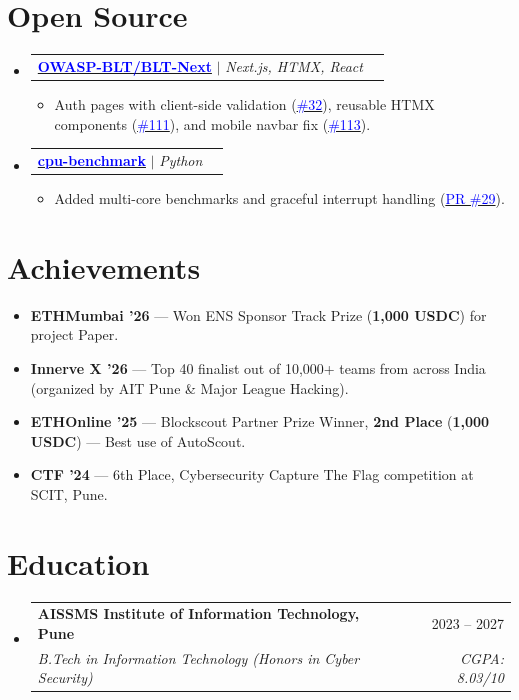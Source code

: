\documentclass[a4paper,11pt]{article}
\makeatletter
\newcommand{\resumeItem}[1]{
  \item\small{
    {#1 \vspace{-2pt}}
  }
}
\newcommand{\resumeSubheading}[4]{
  \vspace{-2pt}\item
    \begin{tabular*}{0.97\textwidth}[t]{l@{\extracolsep{\fill}}r}
      \textbf{#1} & #2 \\
      \textit{\small#3} & \textit{\small #4} \\
    \end{tabular*}\vspace{-7pt}
}
\newcommand{\resumeProjectHeading}[2]{
    \item
    \begin{tabular*}{0.97\textwidth}{l@{\extracolsep{\fill}}r}
      \small#1 & #2 \\
    \end{tabular*}\vspace{-7pt}
}
\newcommand{\resumeSubHeadingListStart}{\begin{itemize}[leftmargin=0.15in, label={}]}
\newcommand{\resumeSubHeadingListEnd}{\end{itemize}}
\newcommand{\resumeItemListStart}{\begin{itemize}}
\newcommand{\resumeItemListEnd}{\end{itemize}\vspace{-4pt}}
\makeatother
\begin{document}
\section{Open Source}
  \resumeSubHeadingListStart
    \resumeProjectHeading
    {\textbf{\href{https://github.com/OWASP-BLT/BLT-Next}{\textcolor{blue}{OWASP-BLT/BLT-Next}}} $|$ \footnotesize\emph{Next.js, HTMX, React}}{}
    \resumeItemListStart
        \resumeItem{Auth pages with client-side validation (\href{https://github.com/OWASP-BLT/BLT-Next/pull/32}{\textcolor{blue}{\#32}}), reusable HTMX components (\href{https://github.com/OWASP-BLT/BLT-Next/pull/111}{\textcolor{blue}{\#111}}), and mobile navbar fix (\href{https://github.com/OWASP-BLT/BLT-Next/pull/113}{\textcolor{blue}{\#113}}).}
    \resumeItemListEnd
    \resumeProjectHeading
    {\textbf{\href{https://github.com/alexdedyura/cpu-benchmark}{\textcolor{blue}{cpu-benchmark}}} $|$ \footnotesize\emph{Python}}{}
    \resumeItemListStart
        \resumeItem{Added multi-core benchmarks and graceful interrupt handling (\href{https://github.com/alexdedyura/cpu-benchmark/pull/29}{\textcolor{blue}{PR \#29}}).}
    \resumeItemListEnd
  \resumeSubHeadingListEnd

\section{Achievements}
\begin{itemize}[leftmargin=0.15in, label={}, itemsep=-1pt]
    \footnotesize
    \item \textbf{ETHMumbai '26} — Won ENS Sponsor Track Prize (\textbf{1,000 USDC}) for project Paper.
    \item \textbf{Innerve X '26} — Top 40 finalist out of 10,000+ teams from across India (organized by AIT Pune \& Major League Hacking).
    \item \textbf{ETHOnline '25} — Blockscout Partner Prize Winner,\textbf{ 2nd Place} (\textbf{1,000 USDC}) — Best use of AutoScout.
    \item \textbf{CTF '24} — 6th Place, Cybersecurity Capture The Flag competition at SCIT, Pune.
\end{itemize}

\section{Education}
  \resumeSubHeadingListStart
    \resumeSubheading
      {AISSMS Institute of Information Technology, Pune}{2023 -- 2027}
      {B.Tech in Information Technology (Honors in Cyber Security)}{CGPA: 8.03/10}
  \resumeSubHeadingListEnd
\end{document}
